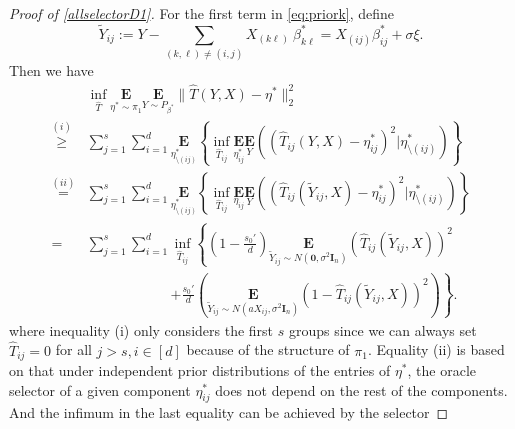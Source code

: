 \documentclass[12pt]{article}
\newtheorem{proof}{Proof}
\begin{document}
\begin{appendix}
\begin{proof}[Proof of \eqref{allselectorD1}]
For the first term in \eqref{eq:priork}, define
\begin{equation*}
\tilde Y_{ij}:= Y - \sum_{(k,\ell) \ne (i,j)} X_{(k\ell)} ~ \beta_{k\ell}^* = X_{(ij)} \beta_{ij}^* + \sigma \xi.
\end{equation*}
Then we have
\begin{align*}
& \inf_{\hat T }\underset{\eta^* \sim \pi_1}{\mathbf E}
    \underset{Y \sim P_{\beta^*} }{\mathbf E} \|\hat T(Y,X) - \eta^* \|_2^2 \\
\overset{(i)}{\ge} & \sum_{j=1}^s \sum_{i=1}^d \underset{\eta_{\setminus (ij)}^* }{\mathbf E}
    \left\{ \inf_{\hat T_{ij} }
    \underset{\eta_{ij}^* }{\mathbf E} \underset{Y}{\mathbf E}
    \left( (\hat T_{ij}(Y,X) - \eta_{ij}^*)^2 \Big| \eta_{\setminus (ij)}^* \right) \right\} \\
\overset{(ii)}{=}& \sum_{j=1}^s \sum_{i=1}^d \underset{\eta_{\setminus (ij)}^* }{\mathbf E} \left\{ \inf_{\hat T_{ij} }
    \underset{\eta_{ij}}{\mathbf E} \underset{Y}{\mathbf E}
    \left( (\hat T_{ij}(\tilde Y_{ij},X) - \eta_{ij}^*)^2 \Big| \eta_{\setminus (ij)}^* \right) \right\} \\
=& \sum_{j=1}^s \sum_{i=1}^d  \inf_{\hat T_{ij}} \left\{
    \left(1-\frac{s_0'}{d}\right)
    \underset{\tilde Y_{ij}\sim N(\mathbf 0,\sigma^2 \mathbf I_n)}{\mathbf E}
     \left( \hat T_{ij}(\tilde Y_{ij},X) \right)^2\right. \\
    &  \qquad\qquad \qquad \left.+ \frac{s_0'}{d} \left(
    \underset{\tilde Y_{ij} \sim  N(aX_{ij},\sigma^2 \mathbf I_n)}{\mathbf E} \left( 1 -\hat T_{ij}(\tilde Y_{ij},X) \right)^2
    \right) \right\}.
\end{align*}
where inequality (i) only considers the first $s$ groups since we can always set $\hat T_{ij} = 0$ for all $ j>s, i \in [d]$ because of the structure of $\pi_1$.
Equality (ii) is based on that under independent prior distributions of the entries of $\eta^*$, the oracle selector of a given component $\eta_{ij}^*$ does not depend on the rest of the components. 
And %
the infimum in the last equality can be achieved by the selector 

\end{proof}
\end{appendix}
\end{document}
